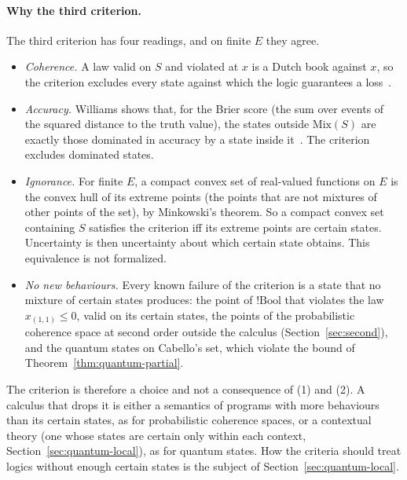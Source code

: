 \paragraph{Why the third criterion.}
The third criterion has four readings, and on finite $E$ they agree.
\begin{itemize}
  \item \emph{Coherence.} A law valid on $S$ and violated at $x$ is a
  Dutch book against $x$, so the criterion excludes every state against
  which the logic guarantees a loss~\cite{paris2001}.
  \item \emph{Accuracy.} Williams shows that, for the Brier score (the sum over events of the
  squared distance to the truth value), the states
  outside $\mathrm{Mix}(S)$ are exactly those dominated in accuracy by a
  state inside it~\cite{williams2012}. The criterion excludes dominated states.
  \item \emph{Ignorance.} For finite $E$, a compact convex set of real-valued
  functions on $E$ is the convex hull of its extreme points (the points
  that are not mixtures of other points of the set), by
  Minkowski's theorem. So a compact convex
  set containing $S$ satisfies the criterion iff its extreme points are
  certain states. Uncertainty is then uncertainty about which certain
  state obtains. This equivalence is not formalized.
  \item \emph{No new behaviours.} Every known failure of the criterion is
  a state that no mixture of certain states produces: the point of
  $!\mathrm{Bool}$ that violates the law $x_{(1,1)} \le 0$, valid on its
  certain states, the points of the probabilistic coherence space at
  second order outside the calculus (Section~\ref{sec:second}), and the
  quantum states on Cabello's set, which violate the bound of
  Theorem~\ref{thm:quantum-partial}.
\end{itemize}
The criterion is therefore a choice and not a consequence of (1) and
(2). A calculus that drops it is either a semantics of programs with more
behaviours than its certain states, as for probabilistic coherence
spaces, or a contextual theory (one whose states are certain only
within each context, Section~\ref{sec:quantum-local}), as for quantum
states. How the criteria
should treat logics without enough certain states is the subject of
Section~\ref{sec:quantum-local}.

